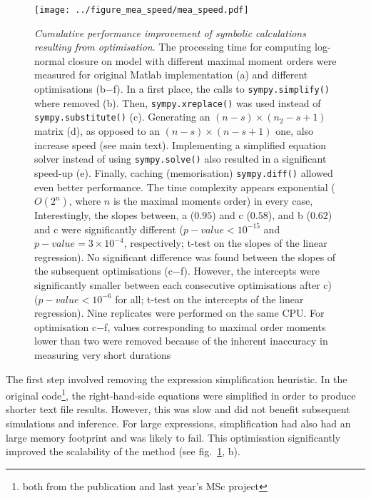 \begin{figure}[tbh]

\texttt{[image: ../figure\_mea\_speed/mea\_speed.pdf]}
\caption{\emph{Cumulative performance improvement of symbolic calculations resulting from optimisation}.
The processing time for computing log-normal closure on \pft{} model with different maximal moment orders were measured for original Matlab implementation (a) and different optimisations (b$-$f).
In a first place, the calls to \texttt{sympy.simplify()} where removed (b). 
Then, \texttt{sympy.xreplace()} was used instead of \texttt{sympy.substitute()} (c). 
Generating an $(n-s) \times (n_2-s + 1)$ matrix (d), as opposed to an $(n-s) \times (n-s + 1)$ one, also increase speed (see main text).
Implementing a simplified equation solver instead of using \texttt{sympy.solve()} also resulted in a significant speed-up (e). Finally, caching (memorisation) \texttt{sympy.diff()} allowed even better performance.
The time complexity appears exponential ($O(2^n)$, where $n$ is the maximal moments order) in every case, 
Interestingly, the slopes between, a ($0.95$) and c ($0.58$), and b ($0.62$) and c were significantly different ($p-value <10^{-15}$ and $p-value = 3 \times 10^{-4}$, respectively; t-test on the slopes of the linear regression). 
No significant difference was found between the slopes of the subsequent optimisations (c$-$f). 
However, the intercepts were significantly smaller between each consecutive optimisations after c) ($p-value < 10^{-6}$ for all; t-test on the intercepts of the linear regression).
Nine replicates were performed on the same CPU. For optimisation c$-$f, values corresponding to maximal order moments lower than two were removed because of the inherent inaccuracy in measuring very short durations}
\label{fig:mea_speed}
\end{figure}


The first step involved removing the expression simplification heuristic.
In the original code\footnote{both from the publication and last year's MSc project}, the right-hand-side equations were simplified in order to produce shorter text file results.
However, this was slow and did not benefit subsequent simulations and inference.
For large expressions, simplification had also had an large memory footprint and was likely to fail.
This optimisation significantly improved the scalability of the method (see fig.~\ref{fig:mea_speed}, b).


